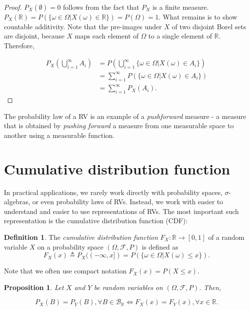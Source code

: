 \documentclass{book}
\theoremstyle{plain}%
\newtheorem{proposition}{Proposition}[section]
\theoremstyle{definition}
\newtheorem{definition}{Definition}[section]
\newlength{\arrow}
\begin{document}
\begin{proof}
$P_X(\emptyset) = 0$ follows from the fact that $P_X$ is a finite measure. $P_X(\mathbb{R}) = P(\{\omega \in \Omega | X(\omega) \in \mathbb{R}\}) = P(\Omega) = 1$. What remains is to show countable additivity. Note that the pre-images under $X$ of two disjoint Borel sets are disjoint, because $X$ maps each element of $\Omega$ to a single element of $\mathbb{R}$. Therefore,

\begin{align*}
    P_X(\bigcup_{i=1}^\infty A_i) &= P(\bigcup_{i=1}^\infty  \{\omega \in \Omega | X(\omega) \in A_i\}) \\
    &= \sum_{i=1}^\infty P(\{\omega \in \Omega | X(\omega) \in A_i\}) \\
    &= \sum_{i=1}^\infty P_X(A_i).
\end{align*}

\end{proof}

The probability law of a RV is an example of a \emph{pushforward} measure - a measure that is obtained by \emph{pushing forward} a measure from one measurable space to another using a measurable function.

\section{Cumulative distribution function}

In practical applications, we rarely work directly with probability spaces, $\sigma$-algebras, or even probability laws of RVs. Instead, we work with easier to understand and easier to use representations of RVs. The most important such representation is the cumulative distribution function (CDF):

\begin{definition}The \textit{cumulative distribution function} $F_X: \mathbb{R} \rightarrow [0, 1]$ of a random variable $X$ on a probability space $(\Omega, \mathcal{F}, P)$ is defined as $$F_X(x) \triangleq P_X((-\infty,x]) = P(\{\omega \in \Omega | X(\omega) \leq x\}) .$$
\end{definition}

Note that we often use compact notation $F_X(x) = P(X \leq x)$.

\begin{proposition}
Let $X$ and $Y$ be random variables on $(\Omega, \mathcal{F}, P)$. Then,

$$P_X(B) = P_Y(B), \forall B \in \mathcal{B}_\mathbb{R} \Longleftrightarrow F_X(x) = F_Y(x),  \forall x \in \mathbb{R}.$$

\end{proposition}
\end{document}
